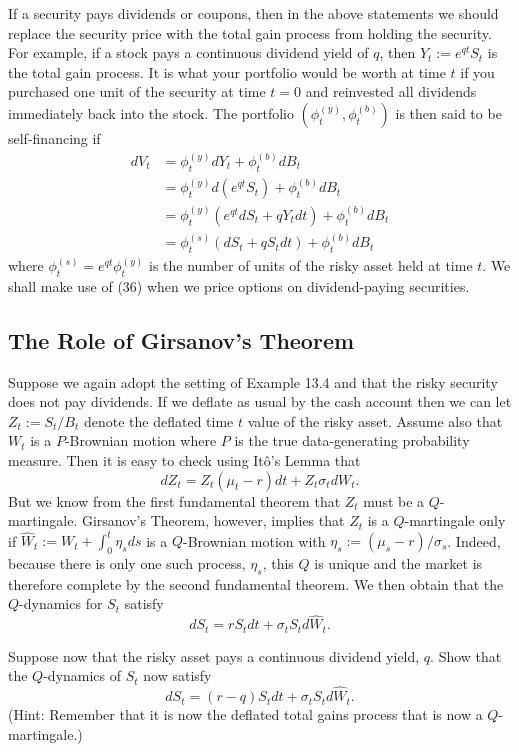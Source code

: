 \begin{remark}
If a security pays dividends or coupons, then in the above statements we should replace the security price with the total gain process from holding the security. For example, if a stock pays a continuous dividend yield of $q$, then $Y_t:=e^{qt} S_t$ is the total gain process. It is what your portfolio would be worth at time $t$ if you purchased one unit of the security at time $t=0$ and reinvested all dividends immediately back into the stock. The portfolio $(\phi_t^{(y)},\phi_t^{(b)})$ is then said to be self-financing if
\begin{align*}
dV_t &= \phi_t^{(y)} dY_t + \phi_t^{(b)} dB_t \\
&= \phi_t^{(y)} d(e^{qt} S_t) + \phi_t^{(b)} dB_t \\
&= \phi_t^{(y)} \left(e^{qt} dS_t + q Y_t dt\right) + \phi_t^{(b)} dB_t \\
&= \phi_t^{(s)} \left(dS_t + q S_t dt\right) + \phi_t^{(b)} dB_t \tag{36}
\end{align*}
where $\phi_t^{(s)}=e^{qt} \phi_t^{(y)}$ is the number of units of the risky asset held at time $t$. We shall make use of (36) when we price options on dividend-paying securities.
\end{remark}

\subsection{The Role of Girsanov's Theorem}
Suppose we again adopt the setting of Example 13.4 and that the risky security does not pay dividends. If we deflate as usual by the cash account then we can let $Z_t:=S_t/B_t$ denote the deflated time $t$ value of the risky asset. Assume also that $W_t$ is a $P$-Brownian motion where $P$ is the true data-generating probability measure. Then it is easy to check using It\^o's Lemma that
\[dZ_t = Z_t (\mu_t - r) dt + Z_t \sigma_t dW_t. \tag{37}\]
But we know from the first fundamental theorem that $Z_t$ must be a $Q$-martingale. Girsanov's Theorem, however, implies that $Z_t$ is a $Q$-martingale only if $\widehat{W}_t:=W_t+\int_0^t \eta_s ds$ is a $Q$-Brownian motion with $\eta_s:=(\mu_s - r)/\sigma_s$. Indeed, because there is only one such process, $\eta_s$, this $Q$ is unique and the market is therefore complete by the second fundamental theorem. We then obtain that the $Q$-dynamics for $S_t$ satisfy
\[dS_t = r S_t dt + \sigma_t S_t d\widehat{W}_t.\]

\begin{example}
Suppose now that the risky asset pays a continuous dividend yield, $q$. Show that the $Q$-dynamics of $S_t$ now satisfy
\[dS_t = (r-q) S_t dt + \sigma_t S_t d\widehat{W}_t.\]
(Hint: Remember that it is now the deflated total gains process that is now a $Q$-martingale.)
\end{example}

